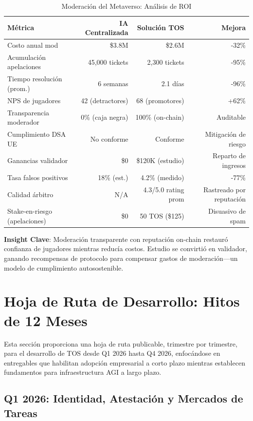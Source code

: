 \documentclass[11pt]{article}
\begin{document}
\begin{table}[H]
\centering
\caption{Moderación del Metaverso: Análisis de ROI}
\label{tab:metaverse-roi}
\begin{tabular}{@{}lrrr@{}}
\toprule
\textbf{Métrica} & \textbf{IA Centralizada} & \textbf{Solución TOS} & \textbf{Mejora} \\ \midrule
Costo anual mod & \$3.8M & \$2.6M & -32\% \\
Acumulación apelaciones & 45,000 tickets & 2,300 tickets & -95\% \\
Tiempo resolución (prom.) & 6 semanas & 2.1 días & -96\% \\
NPS de jugadores & 42 (detractores) & 68 (promotores) & +62\% \\
Transparencia moderador & 0\% (caja negra) & 100\% (on-chain) & Auditable \\
Cumplimiento DSA UE & No conforme & Conforme & Mitigación de riesgo \\
Ganancias validador & \$0 & \$120K (estudio) & Reparto de ingresos \\
Tasa falsos positivos & 18\% (est.) & 4.2\% (medido) & -77\% \\
Calidad árbitro & N/A & 4.3/5.0 rating prom & Rastreado por reputación \\
Stake-en-riesgo (apelaciones) & \$0 & 50 TOS (\$125) & Disuasivo de spam \\
\bottomrule
\end{tabular}
\end{table}

\textbf{Insight Clave}: Moderación transparente con reputación on-chain restauró confianza de jugadores mientras reducía costos. Estudio se convirtió en validador, ganando recompensas de protocolo para compensar gastos de moderación—un modelo de cumplimiento autosostenible.

\section{Hoja de Ruta de Desarrollo: Hitos de 12 Meses}
\label{sec:12month-roadmap}

Esta sección proporciona una hoja de ruta publicable, trimestre por trimestre, para el desarrollo de TOS desde Q1 2026 hasta Q4 2026, enfocándose en entregables que habilitan adopción empresarial a corto plazo mientras establecen fundamentos para infraestructura AGI a largo plazo.

\subsection{Q1 2026: Identidad, Atestación y Mercados de Tareas}
\end{document}
